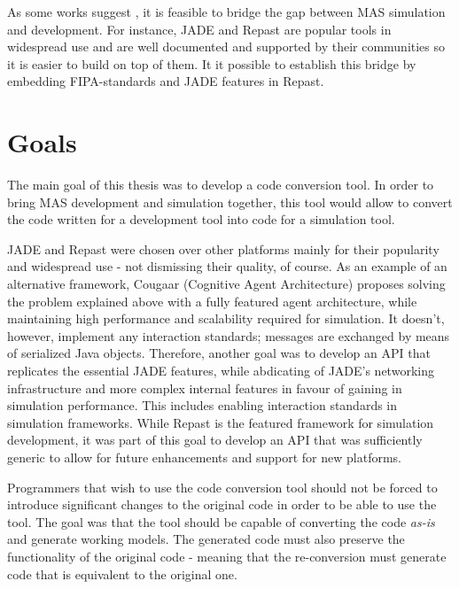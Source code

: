 As some works suggest \cite{gormer2011jrep,garcia2011misia,warden2010towards}, it is feasible to bridge the gap between MAS simulation and development. For instance, JADE and Repast are popular tools in widespread use and are well documented and supported by their communities so it is easier to build on top of them. It it possible to establish this bridge by embedding FIPA-standards and JADE features in Repast.

\section{Goals}
The main goal of this thesis was to develop a code conversion tool. In order to bring MAS development and simulation together, this tool would allow to convert the code written for a development tool into code for a simulation tool. 

JADE and Repast were chosen over other platforms mainly for their popularity and widespread use - not dismissing their quality, of course. As an example of an alternative framework, Cougaar (Cognitive Agent Architecture)\cite{helsinger2004cougaar} proposes solving the problem explained above with a fully featured agent architecture, while maintaining high performance and scalability required for simulation. It doesn't, however, implement any interaction standards; messages are exchanged by means of serialized Java objects. Therefore, another goal was to develop an API that replicates the essential JADE features, while abdicating of JADE's networking infrastructure and more complex internal features in favour of gaining in simulation performance. This includes enabling interaction standards in simulation frameworks. While Repast is the featured framework for simulation development, it was part of this goal to develop an API that was sufficiently generic to allow for future enhancements and support for new platforms.

Programmers that wish to use the code conversion tool should not be forced to introduce significant changes to the original code in order to be able to use the tool. The goal was that the tool should be capable of converting the code \emph{as-is} and generate working models. The generated code must also preserve the functionality of the original code - meaning that the re-conversion must generate code that is equivalent to the original one.

